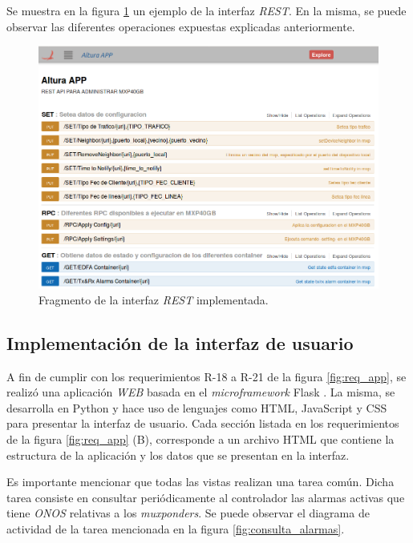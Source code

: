 Se muestra en la figura \ref{fig:rest_capt} un ejemplo de la interfaz \textit{REST}. En la misma, se puede observar las diferentes operaciones expuestas explicadas anteriormente.

\begin{figure}[H]
    \centering
    \includegraphics[scale=0.41]{Figures/captura-rest.png}
    \caption{Fragmento de la interfaz \textit{REST} implementada.}
    \label{fig:rest_capt}
  \end{figure}


  \subsection{Implementación de la interfaz de usuario}
  A fin de cumplir con los requerimientos R-18 a R-21 de la figura \ref{fig:req_app}, se realizó una aplicación \textit{WEB} basada en el \textit{microframework} Flask \parencite{flask}. La misma, se desarrolla en Python y hace uso de lenguajes como HTML, JavaScript y CSS para presentar la interfaz de usuario. Cada sección listada en los requerimientos de la figura \ref{fig:req_app} (B), corresponde a un archivo HTML que contiene la estructura de la aplicación y los datos que se presentan en la interfaz. 

Es importante mencionar que todas las vistas realizan una tarea común. Dicha tarea consiste en consultar periódicamente al controlador las alarmas activas que tiene \textit{ONOS} relativas a los \textit{muxponders}. Se puede observar el diagrama de actividad de la tarea mencionada en la figura \ref{fig:consulta_alarmas}.

